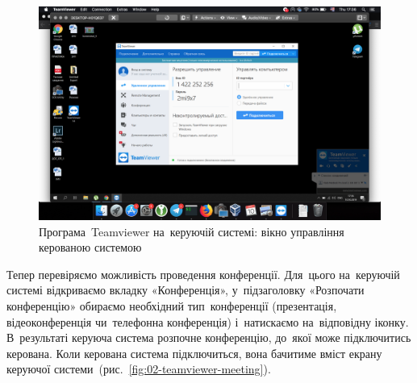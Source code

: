 \documentclass[
	a4paper,
	oneside,
	BCOR = 10mm,
	DIV = 12,
	12pt,
	headings = normal,
]{scrartcl}
\newlength{\gridunitwidth}
\begin{document}
			\begin{figure}[!htbp]
				\centering
				\includegraphics[width = 8\gridunitwidth]{./assets/p03-01.png}
				\caption{Програма~\textenglish{Teamviewer} на~керуючій системі: вікно управління керованою системою}
				\label{fig:01-teamviewer-remote-ctl}
			\end{figure}

			Тепер перевіряємо можливість проведення конференції. Для~цього на~керуючій системі відкриваємо вкладку «Конференція», у~підзаголовку «Розпочати конференцію» обираємо необхідний тип~конференції (презентація, відеоконференція чи~телефонна конференція) і~натискаємо на~відповідну іконку. В~результаті керуюча система розпочне конференцію, до~якої може підключитись керована. Коли керована система підключиться, вона бачитиме вміст екрану керуючої системи~(рис.~\ref{fig:02-teamviewer-meeting}).
\end{document}
